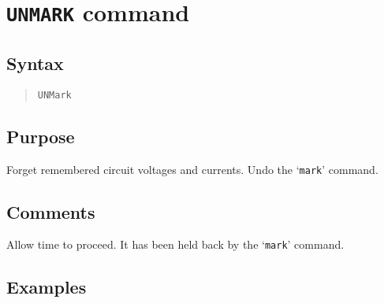 %
%
%
%
\section{{\tt UNMARK} command}
\subsection{Syntax}
\begin{verse}
{\tt UNMark}
\end{verse}
\subsection{Purpose}

Forget remembered circuit voltages and currents.  Undo the `{\tt mark}'
command.
\subsection{Comments}

Allow time to proceed.  It has been held back by the `{\tt mark}' command.
\subsection{Examples}

